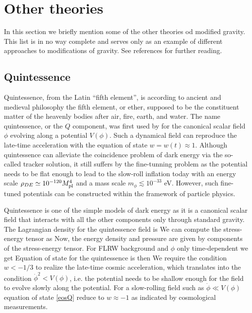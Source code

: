 \section{Other theories}
In this section we briefly mention some of the other theories od modified gravity. This list is in no way complete and serves only as an example of different approaches to modifications of gravity. See references for further reading.
\subsection{Quintessence}
Quintessence, from the Latin ``fifth element'', is according to ancient and medieval philosophy the fifth element, or ether, supposed to be the constituent matter of the heavenly bodies after air, fire, earth, and water. The name quintessence, or the $Q$ component, was first used by \textcite{1998PhRvL..80.1582C} for the canonical scalar field $\phi$ evolving along a potential $V(\phi)$. Such a dynamical field can reproduce the late-time acceleration with the equation of state $w=w(t)\approx1$. Although quintessence can alleviate the coincidence problem of dark energy via the so-called tracker solution, it still suffers by the fine-tunning problem as the potential needs to be flat enough to lead to the slow-roll inflation today with an energy scale $\rho_{DE}\simeq10^{-120}M_{\text{\scriptsize pl}}^4$ and a mass scale $m_\phi\lesssim10^{-33}$ eV. However, such fine-tuned potentials can be constructed within the framework of particle physics.

Quintessence is one of the simple models of dark energy as it is a canonical scalar field that interacts with all the other components only through standard gravity. The Lagrangian density for the quintessence field is
We can compute the stress-energy tensor as
Now, the energy density and pressure are given by components of the stress-energy tensor. For FLRW background and $\phi$ only time-dependent we get
Equation of state for the quintessence is then
We require the condition $w<-1/3$ to realize the late-time cosmic acceleration, which translates into the condition  $\dot{\phi}^2<V(\phi)$, i.e. the potential needs to be shallow enough for the field to evolve slowly along the potential. For a slow-rolling field such as $\dot{\phi}\ll V(\phi)$ equation of state \eqref{eosQ} reduce to $w\approx-1$ as indicated by cosmological measurements.


